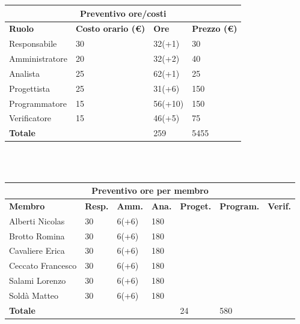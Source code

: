 \documentclass[a4paper, 12pt]{article}
\begin{document}
\begin{center}
	\begin{tabularx}{\textwidth}{|X|X|X|X|}
		\hline
		\multicolumn{4}{|c|}{\textbf{Preventivo ore/costi}}                                      \\
		\hline
		\hline
		\textbf{Ruolo}  & \textbf{Costo orario (\euro)} & \textbf{Ore} & \textbf{Prezzo (\euro)} \\
		\hline
		Responsabile    & 30                            & 32(+1)       & 30                     \\
		\hline
		Amministratore  & 20                            & 32(+2)       & 40                      \\
		\hline
		Analista        & 25                            & 62(+1)       & 25                       \\
		\hline
		Progettista     & 25                            & 31(+6)       & 150                      \\
		\hline
		Programmatore   & 15                            & 56(+10)       & 150                      \\
		\hline
		Verificatore    & 15                            & 46(+5)       & 75                      \\
		\hline
		\hline
		\textbf{Totale} &                               & 259          & 5455                    \\
		\hline
	\end{tabularx}\\[8pt]
	\mbox{}\\
\end{center}

\begin{center}
	\begin{tabularx}{\textwidth}{|X|X|X|X|X|X|X|}
		\hline
		\multicolumn{7}{|c|}{\textbf{Preventivo ore per membro}}                                      \\
		\hline
		\hline
		\textbf{Membro}  & \textbf{Resp.} & \textbf{Amm.} & \textbf{Ana.} &
		\textbf{Proget.} & \textbf{Program.} & \textbf{Verif.} \\
		\hline
		Alberti Nicolas    	& 30 	& 6(+6)       & 180  & &  &                 \\
		\hline
		Brotto Romina    	& 30 	& 6(+6)       & 180  & &  &                 \\
		\hline
		Cavaliere Erica    	& 30 	& 6(+6)       & 180  & &  &                 \\
		\hline
		Ceccato Francesco    	& 30 	& 6(+6)       & 180  & &   &                \\
		\hline
		Salami Lorenzo    	& 30 	& 6(+6)       & 180  & &     &               \\
		\hline
		Soldà Matteo    	& 30 	& 6(+6)       & 180  & &   &                 \\
		\hline
		\hline
		\textbf{Totale} &    & & & 24           & 580      &               \\
		\hline
	\end{tabularx}\\[8pt]
	\mbox{}\\
\end{center}
\end{document}
